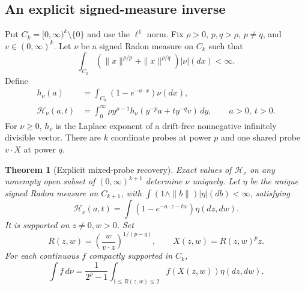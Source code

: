 \documentclass[11pt,letterpaper]{article}
\newtheorem{theorem}{Theorem}[section]
\theoremstyle{definition}
\theoremstyle{remark}
\newcommand{\1}{\mathbf 1}
\begin{document}
\subsection{An explicit signed-measure inverse}

Put $C_k=[0,\infty)^k\setminus\{0\}$ and use the $\ell^1$ norm.
Fix $\rho>0$, $p,q>\rho$, $p\ne q$, and $v\in(0,\infty)^k$.
Let $\nu$ be a signed Radon measure on $C_k$ such that
\begin{equation}\label{p06:eq:mp-moment}
 \int_{C_k}(\|x\|^{\rho/p}+\|x\|^{\rho/q})|\nu|(dx)<\infty.
\end{equation}
Define
\begin{align}
 h_\nu(a)&=\int_{C_k}(1-e^{-a\cdot x})\nu(dx),\label{p06:eq:mp-h}\\
 \mathcal H_\nu(a,t)
 &=\int_0^\infty\rho y^{\rho-1}
       h_\nu(y^{-p}a+t y^{-q}v)\,dy,\qquad a>0,\ t>0.
       \label{p06:eq:mp-H}
\end{align}
For $\nu\ge0$, $h_\nu$ is the Laplace exponent of a drift-free
nonnegative infinitely divisible vector. There are $k$ coordinate
probes at power $p$ and one shared probe $v\cdot X$ at power $q$.

\begin{theorem}[Explicit mixed-probe recovery]\label{p06:thm:mp-recovery}
Exact values of $\mathcal H_\nu$ on any nonempty open subset of
$(0,\infty)^{k+1}$ determine $\nu$ uniquely.
Let $\eta$ be the unique signed Radon measure on $C_{k+1}$, with
$\int(1\wedge\|b\|)|\eta|(db)<\infty$, satisfying
\begin{equation}\label{p06:eq:mp-eta-exponent}
 \mathcal H_\nu(a,t)
       =\int(1-e^{-a\cdot z-tw})\eta(dz,dw).
\end{equation}
It is supported on $z\ne0,w>0$. Set
\begin{equation}\label{p06:eq:mp-inverse-map}
 R(z,w)=\left(\frac{w}{v\cdot z}\right)^{1/(p-q)},
 \qquad X(z,w)=R(z,w)^p z.
\end{equation}
For each continuous $f$ compactly supported in $C_k$,
\begin{equation}\label{p06:eq:mp-inverse-measure}
 \int f\,d\nu=\frac1{2^\rho-1}
       \int_{1\le R(z,w)\le2}f(X(z,w))\eta(dz,dw).
\end{equation}
\end{theorem}
\end{document}
